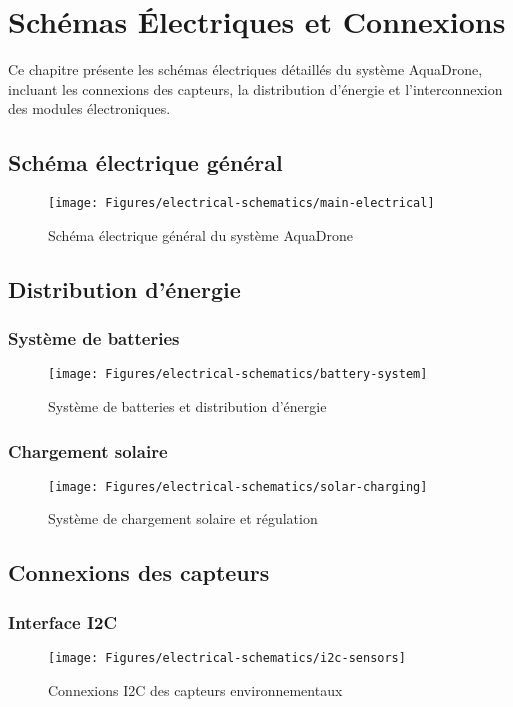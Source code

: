 \chapter{Schémas Électriques et Connexions}
\label{app:electrical-schematics}

Ce chapitre présente les schémas électriques détaillés du système AquaDrone, incluant les connexions des capteurs, la distribution d'énergie et l'interconnexion des modules électroniques.

\section{Schéma électrique général}
\begin{figure}[!htbp]
    \centering
    \texttt{[image: Figures/electrical-schematics/main-electrical]}
    \caption{Schéma électrique général du système AquaDrone}
    \label{fig:main-electrical}
\end{figure}

\section{Distribution d'énergie}
\subsection{Système de batteries}
\begin{figure}[!htbp]
    \centering
    \texttt{[image: Figures/electrical-schematics/battery-system]}
    \caption{Système de batteries et distribution d'énergie}
    \label{fig:battery-system}
\end{figure}

\subsection{Chargement solaire}
\begin{figure}[!htbp]
    \centering
    \texttt{[image: Figures/electrical-schematics/solar-charging]}
    \caption{Système de chargement solaire et régulation}
    \label{fig:solar-charging}
\end{figure}

\section{Connexions des capteurs}
\subsection{Interface I2C}
\begin{figure}[!htbp]
    \centering
    \texttt{[image: Figures/electrical-schematics/i2c-sensors]}
    \caption{Connexions I2C des capteurs environnementaux}
    \label{fig:i2c-sensors}
\end{figure}

